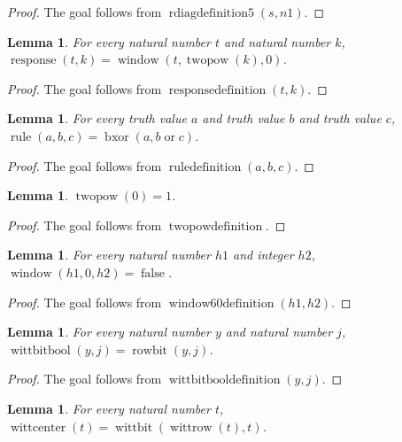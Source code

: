 \documentclass[11pt]{article}
\newtheorem{lemma}[theorem]{Lemma}
\theoremstyle{definition}
\begin{document}
\begin{proof}
The goal follows from \(\operatorname{rdiagdefinition5}(s, n1)\).
\end{proof}
\begin{lemma}
\label{ll:observations:response-definition}
For every natural number \(t\) and natural number \(k\), \(\operatorname{response}(t, k) = \operatorname{window}(t, \operatorname{twopow}(k), 0)\).
\end{lemma}
\begin{proof}
The goal follows from \(\operatorname{responsedefinition}(t, k)\).
\end{proof}
\begin{lemma}
\label{ll:observations:rule-definition}
For every truth value \(a\) and truth value \(b\) and truth value \(c\), \(\operatorname{rule}(a, b, c) = \operatorname{bxor}(a, b \operatorname{or} c)\).
\end{lemma}
\begin{proof}
The goal follows from \(\operatorname{ruledefinition}(a, b, c)\).
\end{proof}
\begin{lemma}
\label{ll:observations:twopow-definition}
\(\operatorname{twopow}(0) = 1\).
\end{lemma}
\begin{proof}
The goal follows from \(\operatorname{twopowdefinition}\).
\end{proof}
\begin{lemma}
\label{ll:observations:window60-definition}
For every natural number \(h1\) and integer \(h2\), \(\operatorname{window}(h1, 0, h2) = \operatorname{false}\).
\end{lemma}
\begin{proof}
The goal follows from \(\operatorname{window60definition}(h1, h2)\).
\end{proof}
\begin{lemma}
\label{ll:observations:witt-bit-bool-definition}
For every natural number \(y\) and natural number \(j\), \(\operatorname{wittbitbool}(y, j) = \operatorname{rowbit}(y, j)\).
\end{lemma}
\begin{proof}
The goal follows from \(\operatorname{wittbitbooldefinition}(y, j)\).
\end{proof}
\begin{lemma}
\label{ll:observations:row-center-definition}
For every natural number \(t\), \(\operatorname{wittcenter}(t) = \operatorname{wittbit}(\operatorname{wittrow}(t), t)\).
\end{lemma}
\end{document}
